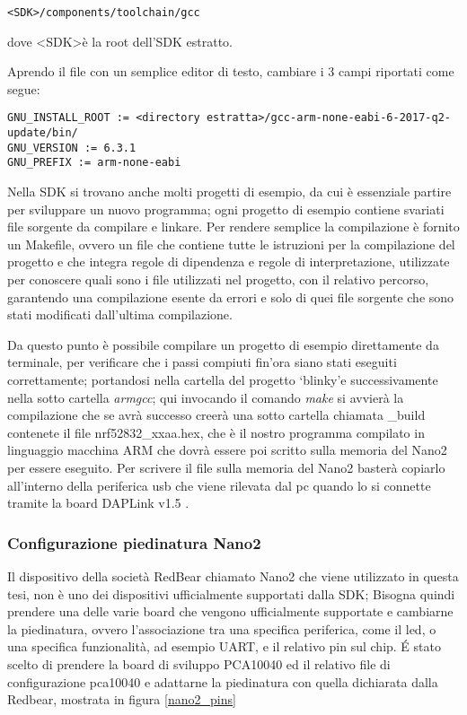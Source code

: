 \begin{verbatim}
<SDK>/components/toolchain/gcc
\end{verbatim}
dove \textless SDK\textgreater  è la root dell'SDK estratto.

Aprendo il file con un semplice editor di testo, cambiare i 3 campi riportati come segue:

\begin{verbatim}
GNU_INSTALL_ROOT := <directory estratta>/gcc-arm-none-eabi-6-2017-q2-update/bin/
GNU_VERSION := 6.3.1
GNU_PREFIX := arm-none-eabi
\end{verbatim}

Nella SDK si trovano anche molti progetti di esempio, da cui è essenziale partire per sviluppare un nuovo programma; ogni progetto di esempio contiene svariati file sorgente da compilare e linkare. Per rendere semplice la compilazione è fornito un Makefile, ovvero un file che contiene tutte le istruzioni per la compilazione del progetto e che integra regole di dipendenza e regole di interpretazione, utilizzate per conoscere quali sono i file utilizzati nel progetto, con il relativo percorso, garantendo una compilazione esente da errori e solo di quei file sorgente che sono stati modificati dall'ultima compilazione.

Da questo punto è possibile compilare un progetto di esempio direttamente da terminale, per verificare che i passi compiuti fin'ora siano stati eseguiti correttamente; portandosi nella cartella del progetto \lq blinky\rq e successivamente nella sotto cartella \emph{armgcc}; qui invocando il comando \emph{make} si avvierà la compilazione che se avrà successo creerà una sotto cartella chiamata \_build contenete il file nrf52832\_xxaa.hex, che è il nostro programma compilato in linguaggio macchina ARM che dovrà essere poi scritto sulla memoria del Nano2 per essere eseguito.
Per scrivere il file sulla memoria del Nano2 basterà copiarlo all'interno della periferica usb che viene rilevata dal pc quando lo si connette tramite la board DAPLink v1.5 .
\subsubsection{Configurazione piedinatura Nano2}
Il dispositivo della società RedBear chiamato Nano2 che viene utilizzato in questa tesi, non è uno dei dispositivi ufficialmente supportati dalla SDK; Bisogna quindi prendere una delle varie board che vengono ufficialmente supportate e cambiarne la piedinatura, ovvero l'associazione tra una specifica periferica, come il led, o una specifica funzionalità, ad esempio UART, e il relativo pin sul chip. 
\'E stato scelto di prendere la board di sviluppo PCA10040 ed il relativo file di configurazione pca10040 e adattarne la piedinatura con quella dichiarata dalla Redbear, mostrata in figura \ref{nano2_pins}

